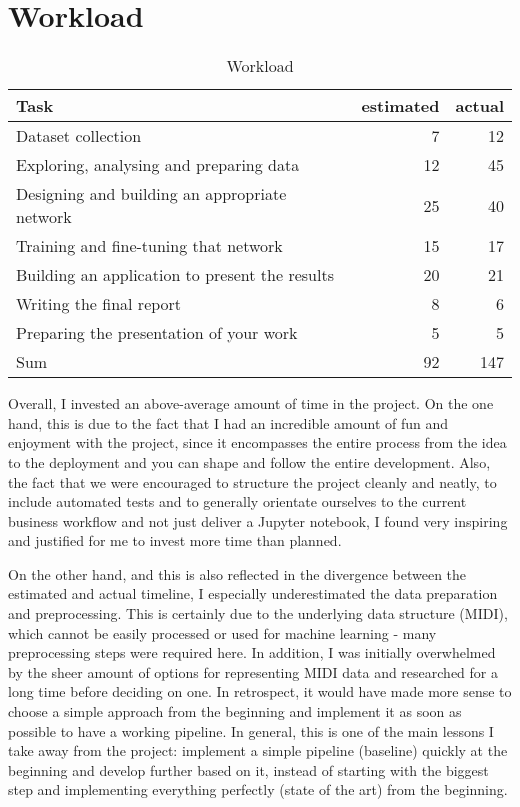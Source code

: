 \documentclass[a4paper, 10pt, xcolor=dvipsnames]{article} %
\begin{document}
\section{Workload}
\begin{table}[!h]
  \begin{center}
    \begin{tabular}{lrr}
      Task                                           & estimated & actual \\
      \hline
      \hline
      Dataset collection                             & 7         & 12     \\
      Exploring, analysing and preparing data        & 12        & 45     \\
      Designing and building an appropriate network  & 25        & 40     \\
      Training and fine-tuning that network          & 15        & 17     \\
      Building an application to present the results & 20        & 21     \\
      Writing the final report                       & 8         & 6      \\
      Preparing the presentation of your work        & 5         & 5      \\
      \hline
      Sum                                            & 92        & 147
    \end{tabular}
    \caption{Workload}
  \end{center}
\end{table}

Overall, I invested an above-average amount of time in the project. On the one
hand, this is due to the fact that I had an incredible amount of fun and
enjoyment with the project, since it encompasses the entire process from the
idea to the deployment and you can shape and follow the entire development.
Also, the fact that we were encouraged to structure the project cleanly and
neatly, to include automated tests and to generally orientate ourselves to the
current business workflow and not just deliver a Jupyter notebook, I found very
inspiring and justified for me to invest more time than planned.

On the other hand, and this is also reflected in the divergence between the
estimated and actual timeline, I especially underestimated the data preparation
and preprocessing. This is certainly due to the underlying data structure
(MIDI), which cannot be easily processed or used for machine learning - many
preprocessing steps were required here. In addition, I was initially
overwhelmed by the sheer amount of options for representing MIDI data and
researched for a long time before deciding on one. In retrospect, it would have
made more sense to choose a simple approach from the beginning and implement it
as soon as possible to have a working pipeline. In general, this is one of the
main lessons I take away from the project: implement a simple pipeline
(baseline) quickly at the beginning and develop further based on it, instead of
starting with the biggest step and implementing everything perfectly (state of
the art) from the beginning.
\end{document}
